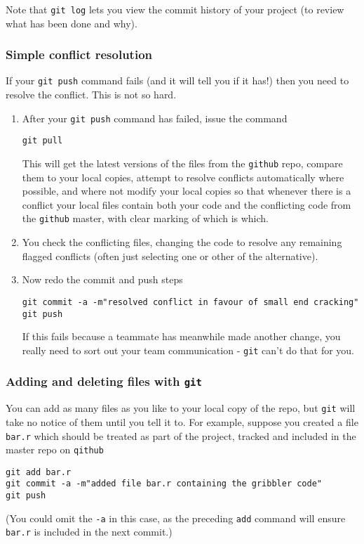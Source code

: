 \documentclass[10pt] {article}
\theoremstyle{definition}
\begin{document}
Note that \verb+git log+ lets you view the commit history of your project (to review what has been done and why).

\subsubsection{Simple conflict resolution}

If your {\tt git push} command fails (and it will tell you if it has!) then you need to resolve the conflict. This is not so hard. 

\begin{enumerate}
\item After your {\tt git push} command has failed, issue the command
\begin{verbatim}
git pull
\end{verbatim}
This will get the latest versions of the files from the {\tt github} repo, compare them to your local copies, attempt to resolve conflicts automatically where possible, and where not modify your local copies so that whenever there is a conflict your local files contain both your code and the conflicting code from the {\tt github} master, with clear marking of which is which. 
\item You check the conflicting files, changing the code to resolve any remaining flagged conflicts (often just selecting one or other of the alternative). 
\item Now redo the commit and push steps
\begin{verbatim}
git commit -a -m"resolved conflict in favour of small end cracking"
git push
\end{verbatim} 
If this fails because a teammate has meanwhile made another change, you really need to sort out your team communication - {\tt git} can't do that for you. 
\end{enumerate}

\subsubsection{Adding and deleting files with {\tt git}}

You can add as many files as you like to your local copy of the repo, but {\tt git} will take no notice of them until you tell it to. For example, suppose you created a file {\tt bar.r} which should be treated as part of the project, tracked and included in the master repo on {\tt qithub}
\begin{verbatim}
git add bar.r
git commit -a -m"added file bar.r containing the gribbler code"
git push
\end{verbatim}
(You could omit the \verb+-a+ in this case, as the preceding \verb+add+ command will ensure \verb+bar.r+ is included in the next commit.)
\end{document}
